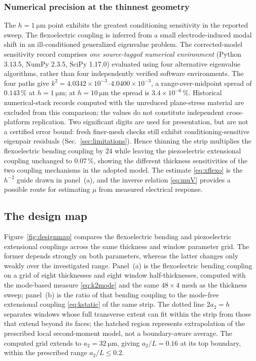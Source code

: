 \subsubsection{Numerical precision at the thinnest geometry}

The $h=\SI{1}{\micro\meter}$ point exhibits the greatest conditioning
sensitivity in the reported sweep. The flexoelectric coupling is inferred
from a small electrode-induced modal shift in an ill-conditioned generalized
eigenvalue problem. The corrected-model sensitivity record comprises
\emph{one source-tagged numerical environment} (Python 3.13.5, NumPy
2.3.5, SciPy 1.17.0) evaluated using four alternative eigenvalue
algorithms, rather than four independently verified software environments.
The four paths give $k^2=4.0342\times10^{-3}$--$4.0400\times10^{-3}$,
a range-over-midpoint spread of $0.143\,\%$ at $h=\SI{1}{\micro\meter}$;
at $h=\SI{10}{\micro\meter}$ the spread is
$3.4\times10^{-6}\,\%$. Historical numerical-stack records computed
with the unreduced plane-stress material are excluded from this comparison;
the values do not constitute independent cross-platform replication.
 Two significant digits are used for presentation, but are not a certified
error bound: fresh finer-mesh checks still exhibit conditioning-sensitive
eigenpair residuals (Sec.~\ref{sec:limitations}). Hence
thinning the strip multiplies the flexoelectric bending coupling by $24$ while
leaving the piezoelectric extensional coupling unchanged to $0.07\,\%$, showing the different thickness sensitivities of the two coupling
mechanisms in the adopted model. The estimate \eqref{eq:xflexo} is the $h^{-2}$ guide drawn in
panel~(a), and the inverse relation \eqref{eq:muV} provides a possible route for estimating $\mu$ from measured electrical response.

\FloatBarrier
\subsection{The design map}
\label{sec:designmap}

Figure~\ref{fig:designmap} compares the flexoelectric bending and
piezoelectric extensional couplings across the same thickness and window
parameter grid. The former depends strongly on both parameters, whereas
the latter changes only weakly over the investigated range. Panel~(a) is the flexoelectric
bending coupling on a grid of eight thicknesses and eight window
half-thicknesses, computed with the mode-based measure \eqref{eq:k2mode} and
the same $48\times4$ mesh as the thickness sweep; panel~(b) is the
ratio of that bending coupling to the mode-free extensional coupling
\eqref{eq:kstatic} of the same strip. The dotted line $2a_2=h$ separates
windows whose full transverse extent can fit within the strip from those
that extend beyond its faces; the hatched region represents extrapolation
of the prescribed local second-moment model, not a boundary-aware average.
The computed grid extends to $a_2=\SI{32}{\micro\meter}$, giving
$a_2/L=0.16$ at its top boundary, within the prescribed
range $a_2/L\le0.2$.

